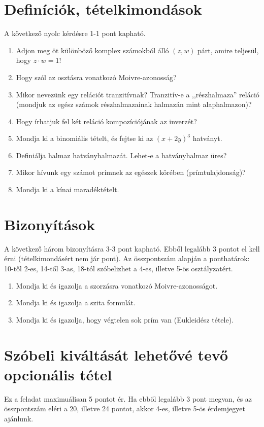 \documentclass[11pt,a4paper]{article}
\begin{document}
\section{Definíciók, tételkimondások}
A következő nyolc kérdésre 1-1 pont kapható. 
\begin{enumerate}\setlength{\itemsep}{2.2cm}

\item Adjon meg öt különböző komplex számokból álló $(z,w)$ párt, amire teljesül, hogy $z\cdot w=1$!
\item Hogy szól az osztásra  vonatkozó Moivre-azonosság?
\item Mikor nevezünk egy relációt tranzitívnak? Tranzitív-e a ,,részhalmaza'' reláció (mondjuk az egész számok részhalmazainak halmazán mint alaphalmazon)?
\item Hogy írhatjuk fel két reláció kompozíciójának az inverzét?
\item Mondja ki a binomiális tételt, és fejtse ki az $(x+2y)^3$ hatványt.
\item Definiálja halmaz hatványhalmazát. Lehet-e a hatványhalmaz üres?
\item Mikor hívunk egy számot prímnek az egészek körében (prímtulajdonság)?
\item Mondja ki a kínai maradéktételt.



\end{enumerate}

\newpage
\section{Bizonyítások}
A következő három bizonyításra 3-3 pont kapható. Ebből legalább 3 pontot el kell érni (tételkimondásért nem jár pont).
Az összpontszám alapján a ponthatárok: 10-től 2-es, 14-től 3-as, 18-tól szóbelizhet a 4-es, illetve 5-ös osztályzatért.
\begin{enumerate}

\item Mondja ki és igazolja a szorzásra vonatkozó Moivre-azonosságot.
\item Mondja ki és igazolja a szita formulát.
\item Mondja ki és igazolja, hogy végtelen sok prím van (Eukleidész tétele).

\end{enumerate}


\section{Szóbeli kiváltását lehetővé tevő opcionális tétel}
Ez a feladat maximuálisan 5 pontot ér. Ha ebből legalább 3 pont megvan, és az összpontszám eléri a 20, illetve 24 pontot, akkor 4-es, illetve 5-ös érdemjegyet ajánlunk.
\end{document}
